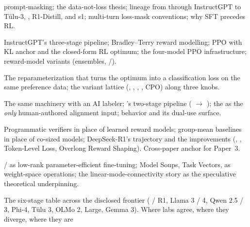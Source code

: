 \begin{description}
  prompt-masking; the data-not-loss thesis; lineage from  through
  InstructGPT to T\"ulu-3, , R1-Distill, and s1; multi-turn
  loss-mask conventions; why SFT precedes RL.
\item[\cref{sec:rlhf} --- RLHF.] InstructGPT's three-stage pipeline;
  Bradley--Terry reward modelling; PPO with KL anchor and the
  closed-form RL optimum; the four-model PPO infrastructure;
  reward-model variants (ensembles, /).
\item[\cref{sec:dpo} --- DPO and offline preference.] The
  reparameterization that turns the  optimum into a classification
  loss on the same preference data; the variant lattice (, ,
  , , CPO) along three knobs.
\item[\cref{sec:rlaif-cai} --- RLAIF and Constitutional AI.] The same
   machinery with an AI labeler; 's two-stage pipeline (
  $\to$ ); the  as the \emph{only} human-authored
  alignment input;  behavior and its dual-use surface.
\item[\cref{sec:rlvr-grpo} --- RLVR and GRPO.] Programmatic verifiers
  in place of learned reward models; group-mean baselines in place of
  co-sized  models; DeepSeek-R1's  trajectory and the 
  improvements (, , Token-Level Loss,
  Overlong Reward Shaping). Cross-paper anchor for Paper~3.
\item[\cref{sec:adaptation-and-merging} --- Adaptation and merging.]
   /  as low-rank parameter-efficient fine-tuning; Model
  Soups, Task Vectors,  as weight-space operations; the
  linear-mode-connectivity story as the speculative theoretical
  underpinning.
\item[\cref{sec:frontier-snapshot} --- Frontier-2026 snapshot.] The
  six-stage table across the disclosed frontier (\allowbreak{} /\allowbreak{} R1,
  Llama 3\allowbreak{} /\allowbreak{} 4, Qwen 2.5\allowbreak{} /\allowbreak{} 3, Phi-4, T\"ulu 3, OLMo 2,  Large,
  Gemma 3). Where labs agree, where they diverge, where they are

\end{description}
